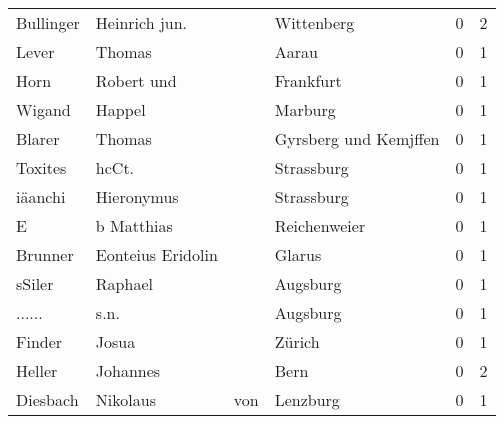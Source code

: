 \begin{tabular}{llllrr}
                Bullinger &                      Heinrich jun. &             &                                  Wittenberg &          0 &         2 \\
                    Lever &                             Thomas &             &                                       Aarau &          0 &         1 \\
                     Horn &                         Robert und &             &                                   Frankfurt &          0 &         1 \\
                   Wigand &                             Happel &             &                                     Marburg &          0 &         1 \\
                   Blarer &                             Thomas &             &                       Gyrsberg und Kemjffen &          0 &         1 \\
                  Toxites &                              hcCt. &             &                                  Strassburg &          0 &         1 \\
                  iäanchi &                         Hieronymus &             &                                  Strassburg &          0 &         1 \\
                        E &                         b Matthias &             &                                Reichenweier &          0 &         1 \\
                  Brunner &                  Eonteius Eridolin &             &                                      Glarus &          0 &         1 \\
                   sSiler &                            Raphael &             &                                    Augsburg &          0 &         1 \\
                   ...... &                               s.n. &             &                                    Augsburg &          0 &         1 \\
                   Finder &                              Josua &             &                                      Zürich &          0 &         1 \\
                   Heller &                           Johannes &             &                                        Bern &          0 &         2 \\
                 Diesbach &                           Nikolaus &         von &                                    Lenzburg &          0 &         1 \\

\end{tabular}
